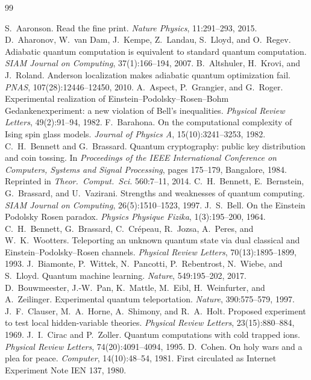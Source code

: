 \begin{thebibliography}{99}

 S.~Aaronson. Read the fine print. \emph{Nature Physics}, 11:291--293, 2015.
 D.~Aharonov, W.~van Dam, J.~Kempe, Z.~Landau, S.~Lloyd, and O.~Regev. Adiabatic quantum computation is equivalent to standard quantum computation. \emph{SIAM Journal on Computing}, 37(1):166--194, 2007.
 B.~Altshuler, H.~Krovi, and J.~Roland. Anderson localization makes adiabatic quantum optimization fail. \emph{PNAS}, 107(28):12446--12450, 2010.
 A.~Aspect, P.~Grangier, and G.~Roger. Experimental realization of Einstein--Podolsky--Rosen--Bohm Gedankenexperiment: a new violation of Bell's inequalities. \emph{Physical Review Letters}, 49(2):91--94, 1982.
 F.~Barahona. On the computational complexity of Ising spin glass models. \emph{Journal of Physics A}, 15(10):3241--3253, 1982.
 C.~H.~Bennett and G.~Brassard. Quantum cryptography: public key distribution and coin tossing. In \emph{Proceedings of the IEEE International Conference on Computers, Systems and Signal Processing}, pages 175--179, Bangalore, 1984. Reprinted in \emph{Theor.\ Comput.\ Sci.} 560:7--11, 2014.
 C.~H.~Bennett, E.~Bernstein, G.~Brassard, and U.~Vazirani. Strengths and weaknesses of quantum computing. \emph{SIAM Journal on Computing}, 26(5):1510--1523, 1997.
 J.~S.~Bell. On the Einstein Podolsky Rosen paradox. \emph{Physics Physique Fizika}, 1(3):195--200, 1964.
 C.~H.~Bennett, G.~Brassard, C.~Crépeau, R.~Jozsa, A.~Peres, and W.~K.~Wootters. Teleporting an unknown quantum state via dual classical and Einstein--Podolsky--Rosen channels. \emph{Physical Review Letters}, 70(13):1895--1899, 1993.
 J.~Biamonte, P.~Wittek, N.~Pancotti, P.~Rebentrost, N.~Wiebe, and S.~Lloyd. Quantum machine learning. \emph{Nature}, 549:195--202, 2017.
 D.~Bouwmeester, J.-W.~Pan, K.~Mattle, M.~Eibl, H.~Weinfurter, and A.~Zeilinger. Experimental quantum teleportation. \emph{Nature}, 390:575--579, 1997.
 J.~F.~Clauser, M.~A.~Horne, A.~Shimony, and R.~A.~Holt. Proposed experiment to test local hidden-variable theories. \emph{Physical Review Letters}, 23(15):880--884, 1969.
 J.~I.~Cirac and P.~Zoller. Quantum computations with cold trapped ions. \emph{Physical Review Letters}, 74(20):4091--4094, 1995.
 D.~Cohen. On holy wars and a plea for peace. \emph{Computer}, 14(10):48--54, 1981. First circulated as Internet Experiment Note IEN 137, 1980.

\end{thebibliography}
